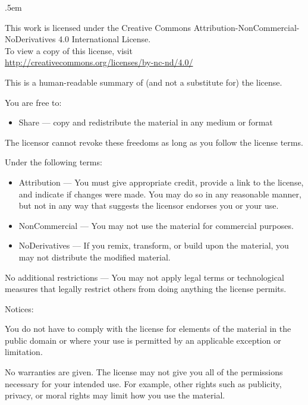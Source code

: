 \label{license}
{\small\parindent 0pt \parskip .5em\raggedright\thispagestyle{empty}

{\center
{\LARGE\ccbyncnd}

This work is licensed under the Creative Commons
Attribution-NonCommercial-NoDerivatives 4.0 International License.\\
To view a copy of this license, visit\\
\href{http://creativecommons.org/licenses/by-nc-nd/4.0}
{http://creativecommons.org/licenses/by-nc-nd/4.0/}

}

\vspace{.5em}
This is a human-readable summary of (and not a substitute for) the
license.

You are free to:

\begin{itemize}

\item Share — copy and redistribute the material in any medium or format

\end{itemize}

The licensor cannot revoke these freedoms as long as you follow the
license terms.

Under the following terms:

\begin{itemize}

\item Attribution — You must give appropriate credit, provide a link to the
license, and indicate if changes were made. You may do so in any
reasonable manner, but not in any way that suggests the licensor
endorses you or your use.

\item NonCommercial — You may not use the material for commercial purposes.

\item NoDerivatives — If you remix, transform, or build upon the material, you
may not distribute the modified material.

\end{itemize}

No additional restrictions — You may not apply legal terms or
technological measures that legally restrict others from doing anything
the license permits.


Notices:

You do not have to comply with the license for elements of the material
in the public domain or where your use is permitted by an applicable
exception or limitation.

No warranties are given. The license may not give you all of the
permissions necessary for your intended use. For example, other rights
such as publicity, privacy, or moral rights may limit how you use the
material.
}
